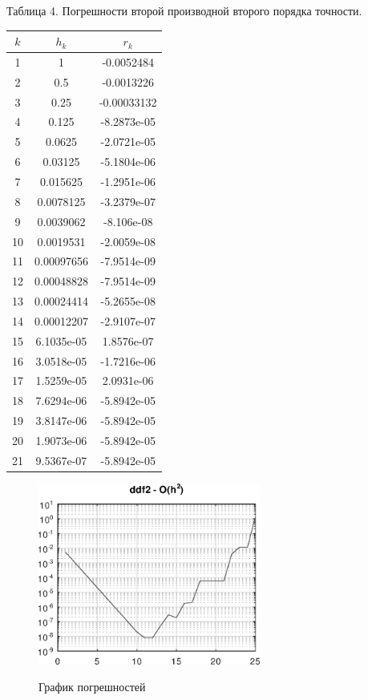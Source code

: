 \documentclass{article}
\begin{document}
	\begin{flushright}
		Таблица 4. Погрешности второй производной второго порядка точности.
	\end{flushright}
	\begin{table}[h!]
		\centering
		\begin{tabular}{|c|c|c|}
			\hline
			$k$  & $h_k$       & $r_k$        \\ \hline
			1  & 1          & -0.0052484  \\ \hline
			2  & 0.5        & -0.0013226  \\ \hline
			3  & 0.25       & -0.00033132 \\ \hline
			4  & 0.125      & -8.2873e-05 \\ \hline
			5  & 0.0625     & -2.0721e-05 \\ \hline
			6  & 0.03125    & -5.1804e-06 \\ \hline
			7  & 0.015625   & -1.2951e-06 \\ \hline
			8  & 0.0078125  & -3.2379e-07 \\ \hline
			9  & 0.0039062  & -8.106e-08  \\ \hline
			10 & 0.0019531  & -2.0059e-08 \\ \hline
			11 & 0.00097656 & -7.9514e-09 \\ \hline
			12 & 0.00048828 & -7.9514e-09 \\ \hline
			13 & 0.00024414 & -5.2655e-08 \\ \hline
			14 & 0.00012207 & -2.9107e-07 \\ \hline
			15 & 6.1035e-05 & 1.8576e-07  \\ \hline
			16 & 3.0518e-05 & -1.7216e-06 \\ \hline
			17 & 1.5259e-05 & 2.0931e-06  \\ \hline
			18 & 7.6294e-06 & -5.8942e-05 \\ \hline
			19 & 3.8147e-06 & -5.8942e-05 \\ \hline
			20 & 1.9073e-06 & -5.8942e-05 \\ \hline
			21 & 9.5367e-07 & -5.8942e-05 \\ \hline
			
		\end{tabular}
	\end{table}
	\newpage
	\begin{figure}[h!] 
		\centering
		\renewcommand{\figurename}{Рисунок}
		\includegraphics [width=0.65\textwidth]{../img/ddf1}\\ 
		\caption{График погрешностей  \label{fig.4}}
	\end{figure}
\end{document}
